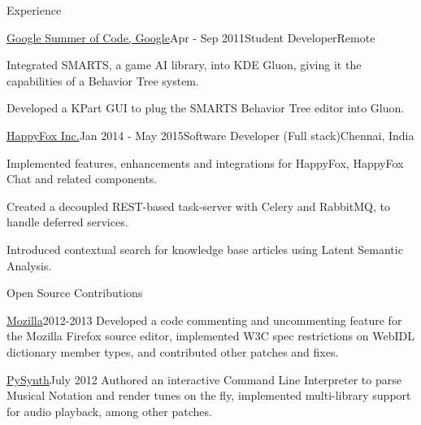 \documentclass{resume} %
\begin{document}
\begin{rSection}{Experience}
\vspace{2mm}

    \begin{rSubsection}{\href{https://www.google-melange.com/gsoc/project/details/google/gsoc2011/pranavrc/5757334940811264}{Google Summer of Code, Google}}{Apr - Sep 2011}{Student Developer}{Remote}
\item Integrated SMARTS, a game AI library, into KDE Gluon, giving it the capabilities of a Behavior Tree system.
\item Developed a KPart GUI to plug the SMARTS Behavior Tree editor into Gluon.
\end{rSubsection}


\begin{rSubsection}{\href{https://happyfox.com/}{HappyFox Inc.}}{Jan 2014 - May 2015}{Software Developer (Full stack)}{Chennai, India}
\item Implemented features, enhancements and integrations for HappyFox, HappyFox Chat and related components.
\item Created a decoupled REST-based task-server with Celery and RabbitMQ, to handle deferred services.
\item Introduced contextual search for knowledge base articles using Latent Semantic Analysis.
\end{rSubsection}


\end{rSection}


\begin{rSection}{Open Source Contributions}
\vspace{2mm}

\begin{rSubsection}{\href{https://bugzilla.mozilla.org/user\%5Fprofile?user\%5Fid=431664}{Mozilla}}{2012-2013}{}{}
Developed a code commenting and uncommenting feature for the Mozilla Firefox source editor, implemented W3C spec restrictions on WebIDL dictionary member types, and contributed other patches and fixes.
\end{rSubsection}

\begin{rSubsection}{\href{https://github.com/mdoege/PySynth/commits?author=pranavrc}{PySynth}}{July 2012}{}{}
Authored an interactive Command Line Interpreter to parse Musical Notation and render tunes on the fly, implemented multi-library support for audio playback, among other patches.
\end{rSubsection}

\end{rSection}
\end{document}
